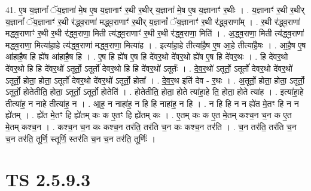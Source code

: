 \documentclass[17pt]{extarticle}
\begin{document}
41. ए॒ष य॒ज्ञानां᳚ ॅय॒ज्ञाना॑ मे॒ष ए॒ष य॒ज्ञानाꣳ॑ र॒थी र॒थीर् य॒ज्ञाना॑ मे॒ष ए॒ष य॒ज्ञानाꣳ॑ र॒थीः । . य॒ज्ञानाꣳ॑ र॒थी र॒थीर् य॒ज्ञानां᳚ ॅय॒ज्ञानाꣳ॑ र॒थी र॑द्ध्व॒राणा॑ मद्ध्व॒राणाꣳ॑ र॒थीर् य॒ज्ञानां᳚ ॅय॒ज्ञानाꣳ॑ र॒थी र॑द्ध्व॒राणा᳚म् । . र॒थी र॑द्ध्व॒राणा॑ मद्ध्व॒राणाꣳ॑ र॒थी र॒थी र॑द्ध्व॒राणा॒ मिती त्य॑द्ध्व॒राणाꣳ॑ र॒थी र॒थी र॑द्ध्व॒राणा॒ मिति॑ । . अ॒द्ध्व॒राणा॒ मिती त्य॑द्ध्व॒राणा॑ मद्ध्व॒राणा॒ मित्या॑हा॒हे त्य॑द्ध्व॒राणा॑ मद्ध्व॒राणा॒ मित्या॑ह । . इत्या॑हा॒हे तीत्या॑है॒ष ए॒ष आ॒हे तीत्या॑है॒षः । . आ॒है॒ष ए॒ष आ॑हाहै॒ष हि ह्ये॑ष आ॑हाहै॒ष हि । . ए॒ष हि ह्ये॑ष ए॒ष हि दे॑वर॒थो दे॑वर॒थो ह्ये॑ष ए॒ष हि दे॑वर॒थः । . हि दे॑वर॒थो दे॑वर॒थो हि हि दे॑वर॒थो॑ ऽतूर्तो॒ ऽतूर्तो॑ देवर॒थो हि हि दे॑वर॒थो॑ ऽतूर्तः॑ । . दे॒व॒र॒थो॑ ऽतूर्तो॒ ऽतूर्तो॑ देवर॒थो दे॑वर॒थो॑ ऽतूर्तो॒ होता॒ होता॒ ऽतूर्तो॑ देवर॒थो दे॑वर॒थो॑ ऽतूर्तो॒ होता᳚ । . दे॒व॒र॒थ इति॑ देव - र॒थः । . अ॒तूर्तो॒ होता॒ होता॒ ऽतूर्तो॒ ऽतूर्तो॒ होतेतीति॒ होता॒ ऽतूर्तो॒ ऽतूर्तो॒ होतेति॑ । . होतेतीति॒ होता॒ होते त्या॑हा॒हे ति॒ होता॒ होते त्या॑ह । . इत्या॑हा॒हे तीत्या॑ह॒ न नाहे तीत्या॑ह॒ न । . आ॒ह॒ न नाहा॑ह॒ न हि हि नाहा॑ह॒ न हि । . न हि हि न न ह्ये॑त मे॒तꣳ हि न न ह्ये॑तम् । . ह्ये॑त मे॒तꣳ हि ह्ये॑तम् कः क ए॒तꣳ हि ह्ये॑तम् कः । . ए॒तम् कः क ए॒त मे॒तम् कश्च॒न च॒न क ए॒त मे॒तम् कश्च॒न । . कश्च॒न च॒न कः कश्च॒न तर॑ति॒ तर॑ति च॒न कः कश्च॒न तर॑ति । . च॒न तर॑ति॒ तर॑ति च॒न च॒न तर॑ति॒ तूर्णि॒ स्तूर्णि॒ स्तर॑ति च॒न च॒न तर॑ति॒ तूर्णिः॑ । \newline
\pagebreak
{}
\section*{ TS 2.5.9.3 }
\end{document}
